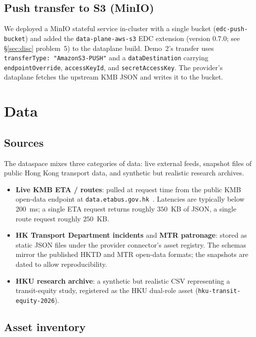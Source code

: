 \documentclass[11pt,a4paper]{article}
\DeclareRobustCommand{\code}[1]{\texttt{\small #1}}
\begin{document}
\subsection{Push transfer to S3 (MinIO)}

We deployed a MinIO stateful service in-cluster with a single bucket
(\code{edc-push-bucket}) and added the \code{data-plane-aws-s3} EDC
extension (version 0.7.0; see §\ref{sec:disc} problem~5) to the dataplane
build. Demo~2's transfer uses
\code{transferType: "AmazonS3-PUSH"} and a \code{dataDestination} carrying
\code{endpointOverride}, \code{accessKeyId}, and \code{secretAccessKey}.
The provider's dataplane fetches the upstream KMB JSON and writes it to
the bucket.

\section{Data}
\label{sec:data}

\subsection{Sources}

The dataspace mixes three categories of data: live external feeds, snapshot
files of public Hong Kong transport data, and synthetic but realistic
research archives.

\begin{itemize}
  \item \textbf{Live KMB ETA / routes}: pulled at request time from the
    public KMB open-data endpoint at \code{data.etabus.gov.hk}~\cite{kmb-od}.
    Latencies are typically below 200~ms; a single ETA request returns
    roughly $350$~KB of JSON, a single route request roughly $250$~KB.
  \item \textbf{HK Transport Department incidents} and \textbf{MTR
    patronage}: stored as static JSON files under the provider connector's
    asset registry. The schemas mirror the published HKTD and MTR open-data
    formats; the snapshots are dated to allow reproducibility.
  \item \textbf{HKU research archive}: a synthetic but realistic CSV
    representing a transit-equity study, registered as the HKU dual-role
    asset (\code{hku-transit-equity-2026}).
\end{itemize}

\subsection{Asset inventory}
\end{document}
